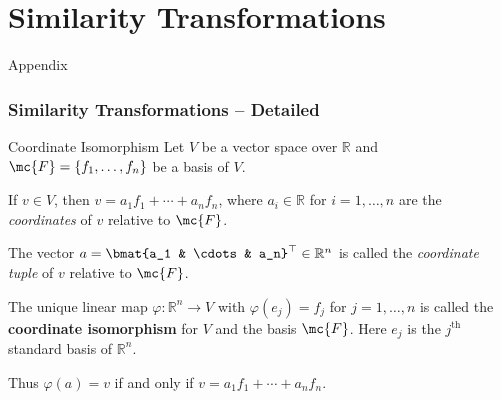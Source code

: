 \appendix

\section{Similarity Transformations}

\begin{frame}
    Appendix


\end{frame}

\begin{frame}
    \frametitle{Similarity Transformations -- Detailed}

    \begin{block}{Coordinate Isomorphism}
        Let $V$ be a vector space over $\mathbb{R}$ and $\mc{F} = \{f_1, \ldots,
        f_n \}$ be a basis of $V$.

        If $v \in V$, then $v = a_1f_1 + \cdots + a_n f_n$, where $a_i \in
        \mathbb{R}$ for $i = 1, \ldots, n$ are the \textit{coordinates} of $v$
        relative to $\mc{F}$. 
        
        The vector $a = \bmat{a_1 & \cdots & a_n}^\top \in
        \mathbb{R}^n$ is called the \textit{coordinate tuple} of $v$ relative to
        $\mc{F}$.

        The unique linear map $\varphi: \mathbb{R}^n \rightarrow V$ with
        $\varphi(e_j) = f_j$ for $j = 1, \ldots, n$ is called the
        \textbf{coordinate isomorphism} for $V$ and the basis $\mc{F}$. Here
        $e_j$ is the $j^{\textrm{th}}$ standard basis of $\mathbb{R}^n$.

        Thus $\varphi(a) = v$ if and only if $v = a_1 f_1 + \cdots + a_n f_n$.
    \end{block}
\end{frame}


